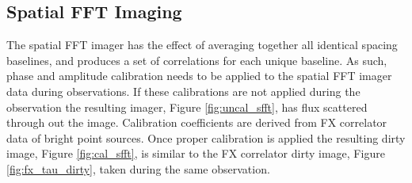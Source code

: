 \documentclass[useAMS,macros,usenatbib]{mn2e}
\begin{document}
%
%
%
%    

\subsection{Spatial FFT Imaging}
\label{sfft_results}

The spatial FFT imager has the effect of averaging together all identical spacing baselines, and produces a set of correlations for each unique baseline.
As such, phase and amplitude calibration needs to be applied to the spatial FFT imager data during observations.
If these calibrations are not applied during the observation the resulting imager, Figure \ref{fig:uncal_sfft}, has flux scattered through out the image.
Calibration coefficients are derived from FX correlator data of bright point sources.
Once proper calibration is applied the resulting dirty image, Figure \ref{fig:cal_sfft}, is similar to the FX correlator dirty image, Figure \ref{fig:fx_tau_dirty}, taken during the same observation.
\end{document}

